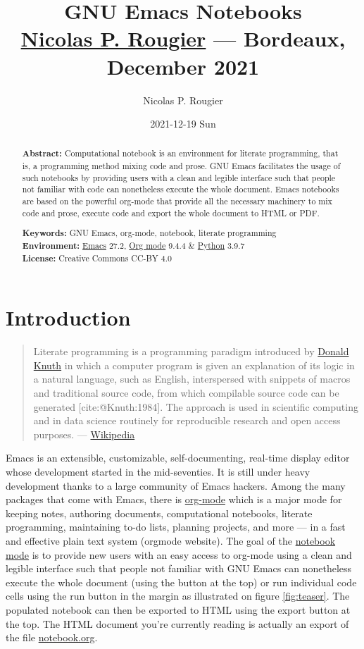 \documentclass[11pt]{article}
\author{Nicolas P. Rougier}
\date{2021-12-19 Sun}
\title{GNU Emacs Notebooks\\\medskip
\large \href{https://www.labri.fr/perso/nrougier/}{Nicolas P. Rougier} — Bordeaux, December 2021}
\begin{document}
\maketitle
\begin{abstract}
\textbf{Abstract:} Computational notebook is an environment for literate programming, that is, a programming method mixing code and prose. GNU Emacs facilitates the usage of such notebooks by providing users with a clean and legible interface such that people not familiar with code can nonetheless execute the whole document. Emacs notebooks are based on the powerful org-mode that provide all the necessary machinery to mix code and prose, execute code and export the whole document to HTML or PDF.  

\textbf{Keywords:} GNU Emacs, org-mode, notebook, literate programming\\
\textbf{Environment:} \href{https://www.gnu.org/software/emacs/}{Emacs} 27.2, \href{https://www.gnu.org/software/emacs/}{Org mode} 9.4.4 \& \href{https://www.python.org/}{Python} 3.9.7\\
\textbf{License:} Creative Commons CC-BY 4.0
\end{abstract}

\section*{Introduction}
\label{sec:org1aa2514}

\begin{quote}
Literate programming is a programming paradigm introduced by \href{https://en.wikipedia.org/wiki/Donald\_Knuth}{Donald Knuth} in which a computer program is given an explanation of its logic in a natural language, such as English, interspersed with snippets of macros and traditional source code, from which compilable source code can be generated [cite:@Knuth:1984]. The approach is used in scientific computing and in data science routinely for reproducible research and open access purposes. --- \href{https://en.wikipedia.org/wiki/Literate\_programming}{Wikipedia}   
\end{quote}

Emacs is an extensible, customizable, self-documenting, real-time display editor whose development started in the mid-seventies. It is still under heavy development thanks to a large community of Emacs hackers. Among the many packages that come with Emacs, there is \href{https://orgmode.org/}{org-mode} which is a major mode for keeping notes, authoring documents, computational notebooks, literate programming, maintaining to-do lists, planning projects, and more — in a fast and effective plain text system (orgmode website). The goal of the \href{https://github.com/rougier/notebook-mode}{notebook mode} is to provide new users with an easy access to org-mode using a clean and legible interface such that people not familiar with GNU Emacs can nonetheless execute the whole document (using the button at the top) or run individual code cells using the run button in the margin as illustrated on figure \ref{fig:teaser}. The populated notebook can then be exported to HTML using the export button at the top. The HTML document you're currently reading is actually an export of the file \href{notebook.org}{notebook.org}.
\end{document}
